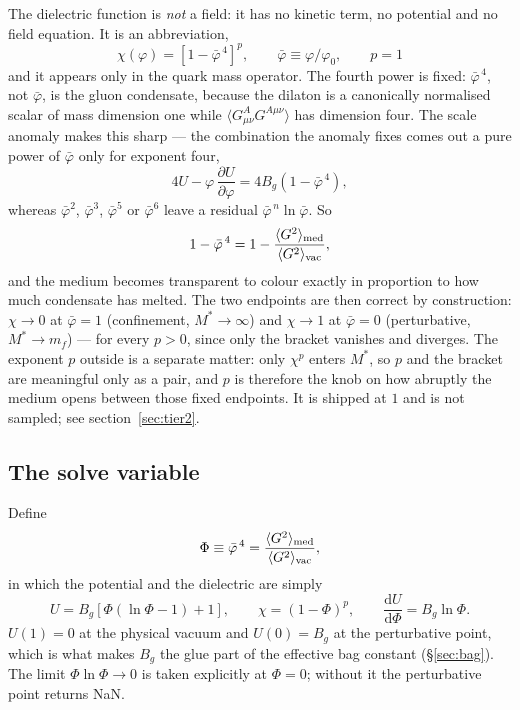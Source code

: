 \documentclass[11pt,a4paper]{article}
\newcommand{\phib}{\bar\varphi}
\newcommand{\Mstar}{M^{*}}
\begin{document}
The dielectric function is \emph{not} a field: it has no kinetic term, no
potential and no field equation. It is an abbreviation,
\begin{equation}
\boxed{\;\chi(\varphi) = \left[1-\phib^{\,4}\right]^{p},
\qquad \phib \equiv \varphi/\varphi_0,\qquad p=1 \;}
\label{eq:chi}
\end{equation}
and it appears only in the quark mass operator. The fourth power is fixed:
$\phib^{\,4}$, not $\phib$, is the gluon condensate, because the dilaton is a
canonically normalised scalar of mass dimension one while
$\langle G^A_{\mu\nu}G^{A\mu\nu}\rangle$ has dimension four. The scale anomaly
makes this sharp --- the combination the anomaly fixes comes out a pure power
of $\phib$ only for exponent four,
\begin{equation}
4U - \varphi\,\frac{\partial U}{\partial\varphi} = 4B_g\left(1-\phib^{\,4}\right),
\end{equation}
whereas $\phib^{2}$, $\phib^{3}$, $\phib^{5}$ or $\phib^{6}$ leave a residual
$\phib^{\,n}\ln\phib$. So
\begin{equation}
1-\phib^{\,4} = 1 - \frac{\langle G^2\rangle_{\rm med}}{\langle G^2\rangle_{\rm vac}},
\end{equation}
and the medium becomes transparent to colour exactly in proportion to how much
condensate has melted. The two endpoints are then correct by construction:
$\chi\to0$ at $\phib=1$ (confinement, $\Mstar\to\infty$) and $\chi\to1$ at
$\phib=0$ (perturbative, $\Mstar\to m_f$) --- for every $p>0$, since only the
bracket vanishes and diverges. The exponent $p$ outside is a separate matter:
only $\chi^{p}$ enters $\Mstar$, so $p$ and the bracket are meaningful only as
a pair, and $p$ is therefore the knob on how abruptly the medium opens between
those fixed endpoints. It is shipped at $1$ and is not sampled; see
section~\ref{sec:tier2}.

\subsection{The solve variable}
\label{sec:Phi}

Define
\begin{equation}
\Phi \equiv \phib^{\,4}
= \frac{\langle G^2\rangle_{\rm med}}{\langle G^2\rangle_{\rm vac}},
\end{equation}
in which the potential and the dielectric are simply
\begin{equation}
U = B_g\left[\Phi(\ln\Phi-1)+1\right],
\qquad
\chi = (1-\Phi)^{p},
\qquad
\frac{\mathrm dU}{\mathrm d\Phi} = B_g\ln\Phi .
\label{eq:U}
\end{equation}
$U(1)=0$ at the physical vacuum and $U(0)=B_g$ at the perturbative point,
which is what makes $B_g$ the glue part of the effective bag constant
(\S\ref{sec:bag}). The limit $\Phi\ln\Phi\to0$ is taken explicitly at
$\Phi=0$; without it the perturbative point returns NaN.
\end{document}
